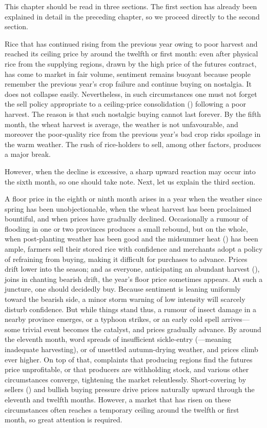 \commentary
This chapter should be read in three sections. The first section has
already been explained in detail in the preceding chapter, so we proceed
directly to the second section.

Rice that has continued rising from the previous year owing to poor
harvest and reached its ceiling price by around the twelfth or first
month: even after physical rice from the supplying regions, drawn by the
high price of the futures contract, has come to market in fair volume,
sentiment remains buoyant because people remember the previous year's
crop failure and continue buying on nostalgia. It does not collapse
easily. Nevertheless, in such circumstances one must not forget the sell
policy appropriate to a ceiling-price consolidation () following a poor harvest. The reason is that such nostalgic
buying cannot last forever. By the fifth month, the wheat harvest is
average, the weather is not unfavourable, and moreover the poor-quality
rice from the previous year's bad crop risks spoilage in the warm
weather. The rush of rice-holders to sell, among other factors, produces
a major break.

However, when the decline is excessive, a sharp upward reaction may
occur into the sixth month, so one should take note. Next, let us
explain the third section.

A floor price in the eighth or ninth month arises in a year when the
weather since spring has been unobjectionable, when the wheat harvest has
been proclaimed bountiful, and when prices have gradually declined.
Occasionally a rumour of flooding in one or two provinces produces a
small rebound, but on the whole, when post-planting weather has been good
and the midsummer heat () has been ample, farmers sell
their stored rice with confidence and merchants adopt a policy of
refraining from buying, making it difficult for purchases to advance.
Prices drift lower into the  season; and as everyone,
anticipating an abundant harvest (), joins
in chanting bearish drift, the year's floor price sometimes appears. At
such a juncture, one should decidedly buy. Because sentiment is leaning
uniformly toward the bearish side, a minor storm warning of low intensity
will scarcely disturb confidence. But while things stand thus, a rumour
of insect damage in a nearby province emerges, or a typhoon strikes, or
an early cold spell arrives---some trivial event becomes the catalyst,
and prices gradually advance. By around the eleventh month, word spreads
of insufficient sickle-entry (---meaning
inadequate harvesting), or of unsettled autumn-drying weather, and prices
climb ever higher. On top of that, complaints that producing regions find
the futures price unprofitable, or that producers are withholding stock,
and various other circumstances converge, tightening the market
relentlessly. Short-covering by sellers () and bullish
buying pressure drive prices naturally upward through the eleventh and
twelfth months. However, a market that has risen on these circumstances
often reaches a temporary ceiling around the twelfth or first month, so
great attention is required.

